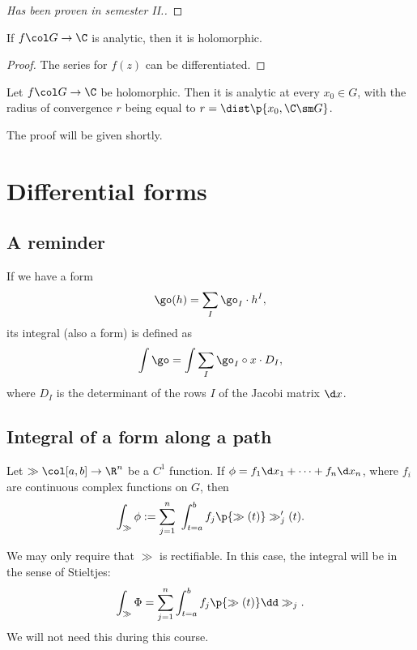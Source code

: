\documentclass[a4paper, 12pt]{article}
\begin{document}
\begin{proof}[Has been proven in semester II.]
\end{proof}

\begin{lemma}
  If $f \col G \to \C$ is analytic, then it is holomorphic.
\end{lemma}

\begin{proof}
  The series for $f(z)$ can be differentiated.
\end{proof}

\begin{theorem}[Cauchy]
  Let $f \col G \to \C$ be holomorphic.
  Then it is analytic at every $x_0 \in G$, with the radius of convergence $r$ being equal to $r = \dist\p{x_0, \C \sm G}$. 
\end{theorem}

The proof will be given shortly.

\section{Differential forms}

\subsection{A reminder}

\begin{definition}
  If we have a form
  $$ \go(h) = \sum_I \go_I \cdot h^I, $$
  its integral (also a form) is defined as
  $$ \int \go = \int \sum_I \go_I \circ x \cdot D_I, $$
  where $D_I$ is the determinant of the rows $I$ of the Jacobi matrix $\d x$.
\end{definition}

\subsection{Integral of a form along a path}

\begin{definition} 
  Let $\gg \col [a, b] \to \R^n$ be a $C^1$ function. If $\phi = f_1 \d x_1 + \dots + f_n \d x_n$, where $f_i$ are continuous complex functions on $G$, then
$$ \int_\gg \phi := \sum_{j=1}^n\ \int_{t=a}^b f_j\p{\gg(t)} \gg'_j(t). $$
\end{definition}

\begin{remark}
  We may only require that $\gg$ is rectifiable.
  In this case, the integral will be in the sense of Stieltjes:
  $$ \int_\gg \Phi = \sum_{j=1}^n \int_{t=a}^b f_j\p{\gg(t)} \dd \gg_j. $$
  We will not need this during this course.
\end{remark}
\end{document}
